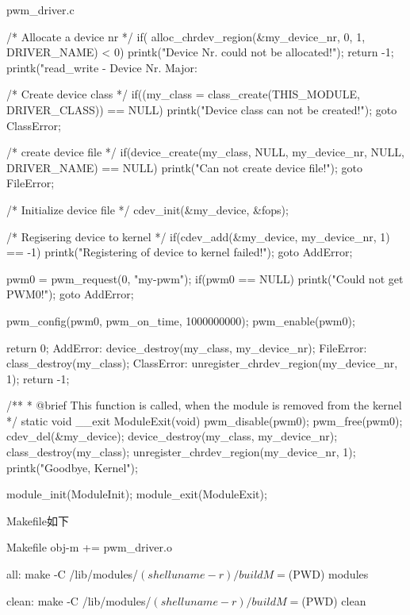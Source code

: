 \documentclass[lang=cn,newtx,10pt,scheme=chinese]{elegantbook}
\begin{document}
\begin{mycode}{pwm\_driver.c}
{    /* Allocate a device nr */
    if( alloc_chrdev_region(&my_device_nr, 0, 1, DRIVER_NAME) < 0) {
        printk("Device Nr. could not be allocated!\n");
        return -1;
    }
    printk("read_write - Device Nr. Major: %

    /* Create device class */
    if((my_class = class_create(THIS_MODULE, DRIVER_CLASS)) == NULL) {
        printk("Device class can not be created!\n");
        goto ClassError;
    }

    /* create device file */
    if(device_create(my_class, NULL, my_device_nr, NULL, DRIVER_NAME) == NULL) {
        printk("Can not create device file!\n");
        goto FileError;
    }

    /* Initialize device file */
    cdev_init(&my_device, &fops);

    /* Regisering device to kernel */
    if(cdev_add(&my_device, my_device_nr, 1) == -1) {
        printk("Registering of device to kernel failed!\n");
        goto AddError;
    }

    pwm0 = pwm_request(0, "my-pwm");
    if(pwm0 == NULL) {
        printk("Could not get PWM0!\n");
        goto AddError;
    }

    pwm_config(pwm0, pwm_on_time, 1000000000);
    pwm_enable(pwm0);

    return 0;
AddError:
    device_destroy(my_class, my_device_nr);
FileError:
    class_destroy(my_class);
ClassError:
    unregister_chrdev_region(my_device_nr, 1);
    return -1;
}

/**
 * @brief This function is called, when the module is removed from the kernel
 */
static void __exit ModuleExit(void) {
    pwm_disable(pwm0);
    pwm_free(pwm0);
    cdev_del(&my_device);
    device_destroy(my_class, my_device_nr);
    class_destroy(my_class);
    unregister_chrdev_region(my_device_nr, 1);
    printk("Goodbye, Kernel\n");
}

module_init(ModuleInit);
module_exit(ModuleExit);
\end{mycode}

Makefile如下

\begin{mycode}{Makefile}
obj-m += pwm_driver.o

all:
    make -C /lib/modules/$(shell uname -r)/build M=$(PWD) modules

clean:
    make -C /lib/modules/$(shell uname -r)/build M=$(PWD) clean
\end{mycode}
\end{document}
